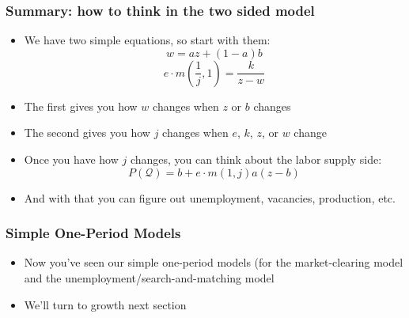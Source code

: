 \documentclass{beamer}
\begin{document}
\begin{frame}
\frametitle[alignment=center]{Summary: how to think in the two sided model}
\begin{itemize}
\item We have two simple equations, so start with them:
$$w=az+(1-a)b$$
$$e\cdot m\left(\frac{1}{j},1\right)=\frac{k}{z-w}$$
\item The first gives you how $w$ changes when $z$ or $b$ changes
\item The second gives you how $j$ changes when $e$, $k$, $z$, or $w$ change
\item Once you have how $j$ changes, you can think about the labor supply side:
$$P(\mathcal{Q})=b+e\cdot m(1,j)a(z-b)$$
\item And with that you can figure out unemployment, vacancies, production, etc.
\end{itemize}
\end{frame}

\begin{frame}
\frametitle[alignment=center]{Simple One-Period Models}
\begin{itemize}
\item Now you've seen our simple one-period models (for the market-clearing model and the unemployment/search-and-matching model
\bigskip
\item We'll turn to growth next section
\end{itemize}
\end{frame}
\end{document}
